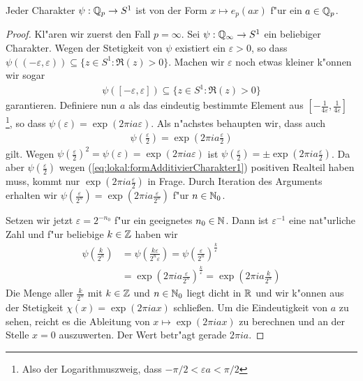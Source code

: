 		\begin{lemma}
			Jeder Charakter $\psi: {\mathbb{Q}_p} \to S^1$ ist von der Form $x \mapsto e_p(ax)$ f"ur ein $a \in {\mathbb{Q}_p}$.
		\end{lemma}
		\begin{proof}
			Kl"aren wir zuerst den Fall $p=\infty$. Sei $\psi: \mathbb{Q}_\infty \to S^1$ ein beliebiger Charakter.
			Wegen der Stetigkeit von $\psi$ existiert ein $\varepsilon > 0$, so dass $\psi((-\varepsilon, \varepsilon)) \subseteq \{z\in S^1: \Re(z)>0\}$.
			Machen wir $\varepsilon$ noch etwas kleiner k"onnen wir sogar 
			\begin{align}\label{eq:lokal:formAdditivierCharakter1}
				\psi([-\varepsilon, \varepsilon]) \subseteq \{z\in S^1: \Re(z)>0\}
			\end{align}
			garantieren.
			Definiere nun $a$ als das eindeutig bestimmte Element aus $[-\frac{1}{4\varepsilon},\frac{1}{4\varepsilon}]$
			\footnote{Also der Logarithmuszweig, dass $-\pi/2<\varepsilon a<\pi/2$}, so dass $\psi (\varepsilon) = \exp(2\pi i a \varepsilon)$.
			Als n"achstes behaupten wir, dass auch
			\begin{align*}
				\psi \left(\frac{\varepsilon}{2}\right) =  \exp\left(2\pi i  a \frac{\varepsilon}{2}\right)
			\end{align*}
			gilt.
			Wegen $\psi (\frac{\varepsilon}{2})^2 = \psi (\varepsilon) = \exp(2\pi i a \varepsilon)$ ist $\psi (\frac{\varepsilon}{2}) = \pm \exp(2\pi i  a \frac{\varepsilon}{2})$.
			Da aber $\psi (\frac{\varepsilon}{2})$ wegen (\ref{eq:lokal:formAdditivierCharakter1}) positiven Realteil haben muss, kommt nur $ \exp(2\pi i  a \frac{\varepsilon}{2})$ in Frage.
			Durch Iteration des Arguments erhalten wir $\psi \left(\frac{\varepsilon}{2^n}\right) = \exp(2\pi i  a \frac{\varepsilon}{2^n})$ f"ur $n\in \mathbb{N}_0$.
			
			Setzen wir jetzt $\varepsilon = 2^{-n_0}$ f"ur ein geeignetes  $n_0\in\mathbb{N}$.
			Dann ist $\varepsilon^{-1}$ eine nat"urliche Zahl und f"ur beliebige $k\in\mathbb{Z}$ haben wir
			\begin{align*}
				\psi \left(\frac{k} {2^{n}}\right) &= \psi \left(\frac{k\varepsilon} {2^{n}\varepsilon}\right) 
										= \psi \left(\frac{\varepsilon} {2^{n}}\right) ^{\frac{k}{\varepsilon}} 
										\\&= \exp\left(2\pi i  a \frac{\varepsilon}{2^n}\right) ^{\frac{k}{\varepsilon}}
										= \exp\left(2\pi i  a \frac{k}{2^n}\right)
			\end{align*}
			Die Menge aller $\frac{k}{2^n}$ mit $k\in \mathbb{Z}$ und $n\in \mathbb{N}_0$ liegt dicht in $\mathbb{R}$ und wir k"onnen aus der Stetigkeit $\chi(x) = \exp(2\pi i a x)$ schließen.
			Um die Eindeutigkeit von $a$ zu sehen, reicht es die Ableitung  von $x \mapsto \exp(2\pi i a x)$ zu berechnen und an der Stelle $x=0$ auszuwerten.
			Der Wert betr"agt gerade $2\pi i a$.
			

\end{proof}
